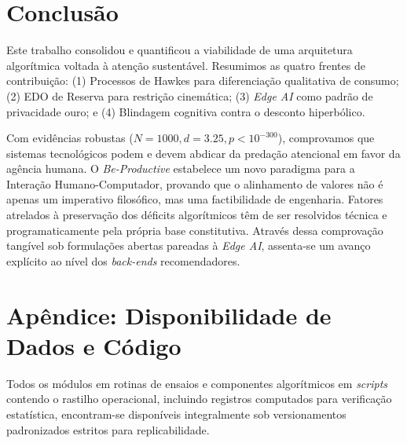 \documentclass{sbc2023}
\begin{document}
\section{Conclusão} \label{sec:conclusion}

Este trabalho consolidou e quantificou a viabilidade de uma arquitetura algorítmica voltada à atenção sustentável. Resumimos as quatro frentes de contribuição: (1) Processos de Hawkes para diferenciação qualitativa de consumo; (2) EDO de Reserva para restrição cinemática; (3) \textit{Edge AI} como padrão de privacidade ouro; e (4) Blindagem cognitiva contra o desconto hiperbólico.

Com evidências robustas ($N = 1000, d = 3.25, p < 10^{-300}$), comprovamos que sistemas tecnológicos podem e devem abdicar da predação atencional em favor da agência humana. O \textit{Be-Productive} estabelece um novo paradigma para a Interação Humano-Computador, provando que o alinhamento de valores não é apenas um imperativo filosófico, mas uma factibilidade de engenharia. Fatores atrelados à preservação dos déficits algorítmicos têm de ser resolvidos técnica e programaticamente pela própria base constitutiva. Através dessa comprovação tangível sob formulações abertas pareadas à \textit{Edge AI}, assenta-se um avanço explícito ao nível dos \textit{back-ends} recomendadores.

\section*{Apêndice: Disponibilidade de Dados e Código}
Todos os módulos em rotinas de ensaios e componentes algorítmicos em \textit{scripts} contendo o rastilho operacional, incluindo registros computados para verificação estatística, encontram-se disponíveis integralmente sob versionamentos padronizados estritos para replicabilidade.



\end{document}
